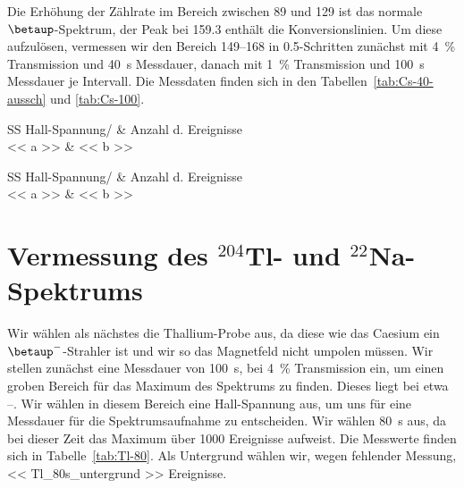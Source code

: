 \documentclass[11pt, ngerman, fleqn, DIV=15, headinclude, BCOR=2cm]{scrreprt}
\begin{document}
Die Erhöhung der Zählrate im Bereich zwischen \SI{89}{\skt} und
\SI{129}{\skt} ist das normale $\betaup$-Spektrum, der Peak bei
\SI{159.3}{\skt} enthält die Konversionslinien. Um diese aufzulösen,
vermessen wir den Bereich \SIrange{149}{168}{\skt} in \SI{.5}{\skt}-Schritten
zunächst mit \SI{4}{\percent} Transmission und \SI{40}{\second} Messdauer,
danach mit \SI{1}{\percent} Transmission und \SI{100}{\second} Messdauer je
Intervall. Die Messdaten finden sich in den Tabellen~\ref{tab:Cs-40-aussch}
und \ref{tab:Cs-100}.

\begin{table}[htbp]
    \centering
    \begin{tabular}{SS}
        {Hall-Spannung/\si{\skt}} & {Anzahl d. Ereignisse} \\
        \midrule
        << a >> & << b >> \\
    \end{tabular}
    \caption{%
        Messwerte zur Kalibrierung des Spektrometers. Probe: ${}^{137}$Cs,
        Zeit: \SI{40}{\second}, Transmission: \SI{4}{\percent}.
    }
    \label{tab:Cs-40-aussch}
\end{table}

\begin{table}[htbp]
    \centering
    \begin{tabular}{SS}
        {Hall-Spannung/\si{\skt}} & {Anzahl d. Ereignisse} \\
        \midrule
        << a >> & << b >> \\
    \end{tabular}
    \caption{%
        Messwerte zur Kalibrierung des Spektrometers. Probe: ${}^{137}$Cs,
        Zeit: \SI{100}{\second}, Transmission: \SI{1}{\percent}.
    }
    \label{tab:Cs-100}
\end{table}

\section{Vermessung des ${}^{204}$Tl- und ${}^{22}$Na-Spektrums}

Wir wählen als nächstes die Thallium-Probe aus, da diese wie das Caesium ein
$\betaup^-$-Strahler ist und wir so das Magnetfeld nicht umpolen müssen. Wir
stellen zunächst eine Messdauer von \SI{100}{\second}, bei \SI{4}{\percent}
Transmission ein, um einen groben Bereich für das Maximum des Spektrums zu
finden. Dieses liegt bei etwa \SIrange{}{}{\skt}. Wir wählen in diesem Bereich
eine Hall-Spannung aus, um uns für eine Messdauer für die Spektrumsaufnahme
zu entscheiden. Wir wählen \SI{80}{\second} aus, da bei dieser Zeit das Maximum
über \num{1000} Ereignisse aufweist. Die Messwerte finden sich in
Tabelle~\ref{tab:Tl-80}. Als Untergrund wählen wir, wegen fehlender Messung,
\num{<< Tl_80s_untergrund >>} Ereignisse.
\end{document}
